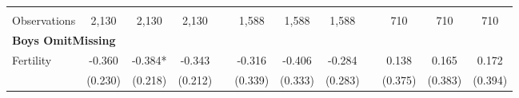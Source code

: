 \begin{landscape}
\begin{table}[htpb!]
\begin{center}
\begin{tabular}{lcccp{2mm}cccp{2mm}ccc}
\begin{footnotesize}\end{footnotesize}&\begin{footnotesize}\end{footnotesize}&\begin{footnotesize}\end{footnotesize}&\begin{footnotesize}\end{footnotesize}&\begin{footnotesize}\end{footnotesize}&\begin{footnotesize}\end{footnotesize}&\begin{footnotesize}\end{footnotesize}&\begin{footnotesize}\end{footnotesize}&\begin{footnotesize}\end{footnotesize}&\begin{footnotesize}\end{footnotesize}&\begin{footnotesize}\end{footnotesize}&\begin{footnotesize}\end{footnotesize}\\Observations&2,130&2,130&2,130&&1,588&1,588&1,588&&710&710&710\\
\multicolumn{12}{l}{\textbf{Boys OmitMissing}}\\ 
Fertility&-0.360&-0.384*&-0.343&&-0.316&-0.406&-0.284&&0.138&0.165&0.172\\
&(0.230)&(0.218)&(0.212)&&(0.339)&(0.333)&(0.283)&&(0.375)&(0.383)&(0.394)\\

\end{tabular}
\end{center}
\end{table}
\end{landscape}

